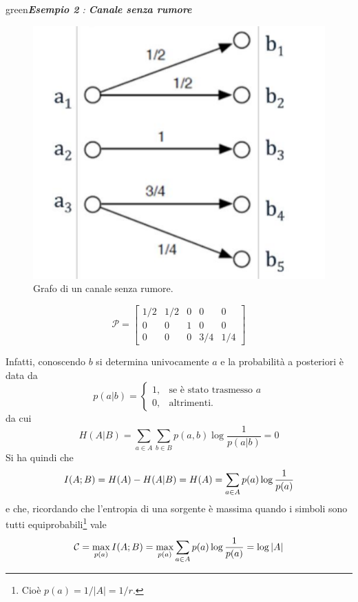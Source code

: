 \begin{mybox}{green}{\textit{\textbf{Esempio 2} : \textbf{Canale senza rumore}}}
\begin{minipage}{0.45\textwidth}
\begin{figure}[H]
    \centering
    \includegraphics[scale=0.2]{img/detchan.png}
    \caption{Grafo di un canale senza rumore.}
\end{figure}
\end{minipage}
\begin{minipage}{0.45\textwidth}
\begin{equation*}
    \mathcal{P} = \begin{bmatrix}
    1/2 & 1/2 & 0 & 0 & 0 \\
    0 & 0 & 1 & 0 & 0 \\
    0 & 0 & 0 & 3/4 & 1/4
    \end{bmatrix}
\end{equation*}
\end{minipage}
\end{mybox}
Infatti, conoscendo $b$ si determina univocamente $a$ e la probabilit\`a a posteriori \`e data da
\begin{equation*}
    p(a|b) = 
    \begin{cases} 
    1, & \text{se \`e stato trasmesso } a \\
    0, & \text{altrimenti.}
    \end{cases}
\end{equation*}
da cui
\begin{equation*}
    H(A|B) = \sum_{a \in A} \sum_{b \in B} p(a,b) \log \frac{1}{p(a|b)} = 0
\end{equation*}
Si ha quindi che
\begin{equation*}
    I(A;B) = H(A) - H(A|B) = H(A) = \sum_{a \in A} p(a) \log \frac{1}{p({a})}
\end{equation*}
e che, ricordando che l'entropia di una sorgente \`e massima quando i simboli sono tutti equiprobabili\footnote{Cio\`e $p(a) = 1/|A| = 1/r$.} vale 
\begin{equation}
    \mathcal{C} = \max_{p(a)} I(A;B) = \max_{p(a)} \sum_{a \in A} p(a) \log \frac{1}{p({a})} = \log |A|
\end{equation}
